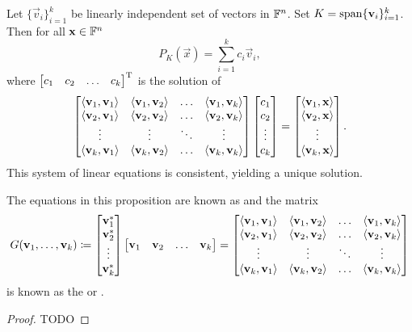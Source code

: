 \begin{proposition}
Let $\{\vec{v}_i\}_{i=1}^k$ be linearly independent set of vectors in $\F^n$. Set $K = \Span\{\vec{v}_i\}_{i=1}^k$. Then for all $\vec{x}\in \F^n$
\[ P_K(\vec{x}) = \sum_{i=1}^k c_i \vec{v}_i, \]
where $\begin{bmatrix}
c_1 & c_2 & \hdots & c_k
\end{bmatrix}^\transp$ is the solution of
\[ \begin{bmatrix}
\inner{\vec{v}_1,\vec{v}_1} & \inner{\vec{v}_1,\vec{v}_2} & \hdots & \inner{\vec{v}_1,\vec{v}_k} \\
\inner{\vec{v}_2,\vec{v}_1} & \inner{\vec{v}_2,\vec{v}_2} & \hdots & \inner{\vec{v}_2,\vec{v}_k} \\
\vdots & \vdots & \ddots & \vdots \\
\inner{\vec{v}_k,\vec{v}_1} & \inner{\vec{v}_k,\vec{v}_2} & \hdots & \inner{\vec{v}_k,\vec{v}_k} \\
\end{bmatrix}\begin{bmatrix}
c_1 \\ c_2 \\ \vdots \\ c_k
\end{bmatrix} = \begin{bmatrix}
\inner{\vec{v}_1,\vec{x}} \\ \inner{\vec{v}_2,\vec{x}} \\ \vdots \\ \inner{\vec{v}_k,\vec{x}}
\end{bmatrix}. \]
This system of linear equations is consistent, yielding a unique solution.
\end{proposition}
The equations in this proposition are known as  and the matrix
\[ G(\vec{v}_1, \ldots, \vec{v}_k) \defeq \begin{bmatrix}
\vec{v}_1^* \\ \vec{v}_2^* \\ \vdots \\ \vec{v}_k^*
\end{bmatrix}\begin{bmatrix}
\vec{v}_1 & \vec{v}_2 & \hdots & \vec{v}_k
\end{bmatrix} = \begin{bmatrix}
\inner{\vec{v}_1,\vec{v}_1} & \inner{\vec{v}_1,\vec{v}_2} & \hdots & \inner{\vec{v}_1,\vec{v}_k} \\
\inner{\vec{v}_2,\vec{v}_1} & \inner{\vec{v}_2,\vec{v}_2} & \hdots & \inner{\vec{v}_2,\vec{v}_k} \\
\vdots & \vdots & \ddots & \vdots \\
\inner{\vec{v}_k,\vec{v}_1} & \inner{\vec{v}_k,\vec{v}_2} & \hdots & \inner{\vec{v}_k,\vec{v}_k} \\
\end{bmatrix} \]
is known as the  or .
\begin{proof}
TODO
\end{proof}

